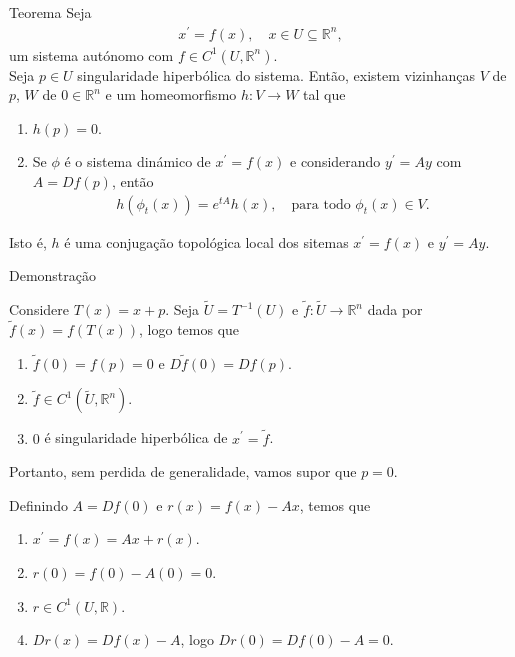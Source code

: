 \begin{frame}{}
  \begin{block}{Teorema}
    Seja
    \begin{align*}
      x^{\prime}=f(x),\quad x\in U\subseteq\mathbb{R}^{n},
    \end{align*}
    um sistema autónomo com $f\in C^{1}(U,\mathbb{R}^{n})$.\\
    Seja $p\in U$ singularidade hiperbólica do sistema. Então, existem vizinhanças $V$ de $p$, $W$ de $0\in\mathbb{R}^{n}$ e um homeomorfismo $h:V\to W$ tal que
    \begin{enumerate}
      \item $h(p)=0$.
      \item Se $\phi$ é o sistema dinámico de $x^{\prime}=f(x)$ e considerando $y^{\prime}=Ay$ com $A=Df(p)$, então
        \begin{align*}
          h(\phi_t(x))=e^{tA}h(x),\quad\text{para todo }\phi_t(x)\in V.
        \end{align*}
    \end{enumerate}
    Isto é, $h$ é uma conjugação topológica local dos sitemas $x^{\prime}=f(x)$ e $y^{\prime}=Ay$. 
  \end{block} 
\end{frame}

\begin{frame}{Demonstração}
  \begin{block}{}
    Considere $T(x)=x+p$. Seja $\tilde{U}=T^{-1}(U)$ e $\tilde{f}:\tilde{U}\to\mathbb{R}^{n}$ dada por $\tilde{f}(x)=f(T(x))$, logo temos que
    \begin{enumerate}
      \item $\tilde{f}(0)=f(p)=0$ e $D\tilde{f}(0)=Df(p)$.
      \item $\tilde{f}\in C^{1}(\tilde{U},\mathbb{R}^{n})$.
      \item $0$ é singularidade hiperbólica de $x^{\prime}=\tilde{f}$. 
    \end{enumerate}
    Portanto, sem perdida de generalidade, vamos supor  que $p=0$.
  \end{block}
  \begin{block}{}
    Definindo $A=Df(0)$ e $r(x)=f(x)-Ax$, temos que
    \begin{enumerate}
      \item $x^{\prime}=f(x)=Ax+r(x)$.
      \item $r(0)=f(0)-A(0)=0$.
      \item $r\in C^{1}(U,\mathbb{R})$.
      \item $Dr(x)=Df(x)-A$, logo $Dr(0)=Df(0)-A=0$.
    \end{enumerate}
  \end{block}
\end{frame}

